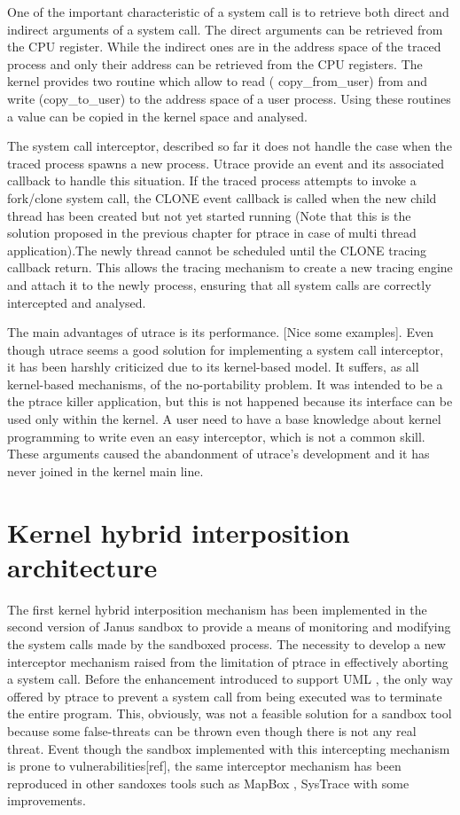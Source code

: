 One of the important characteristic of a system call is to retrieve both direct and indirect arguments of a system call. The direct arguments can be retrieved from the CPU register. While the indirect ones are in the address space of the traced process and only their address can be retrieved from the CPU registers. The kernel provides two routine which allow to read ( copy\_from\_user) from and write (copy\_to\_user) to the address space of a user process. Using these routines a value can be copied in the kernel space and analysed. 

The system call interceptor, described so far it does not handle the case when the traced process spawns a new process. Utrace provide an event and its associated callback to handle this situation. If the traced process attempts to invoke a fork/clone system call, the CLONE event callback is called when the new child thread has been created but not yet started running (Note that this is the solution proposed in the previous chapter for ptrace in case of multi thread application).The newly thread cannot be scheduled until the CLONE tracing callback return. 
This allows the tracing mechanism to create a new tracing engine and attach it to the newly process, ensuring that all system calls are correctly intercepted and analysed. 
 
The main advantages of utrace is its performance. [Nice some examples]. Even though utrace seems a good solution for implementing a system call interceptor, it has been harshly criticized due to its kernel-based model. It suffers, as all kernel-based mechanisms, of the no-portability problem. It was intended to be a the ptrace killer application, but this is not happened because its interface can be used only within the kernel. A user need to have a base knowledge about kernel programming to write even an easy interceptor, which is not a common skill. These arguments caused the abandonment of utrace's development and it has never joined in the kernel main line. 

\section{Kernel hybrid interposition architecture}
\label{interceptor_mechanism}

The first kernel hybrid interposition mechanism has been implemented in  the second version of Janus sandbox \cite{Janus} to provide a means of monitoring and modifying the system calls made by the sandboxed process. The necessity to develop a new interceptor mechanism raised from the limitation of ptrace in effectively aborting a system call. Before the enhancement introduced to support UML \citep{UML_1,UML_2}, the only way offered by ptrace to prevent a system call from being executed was to terminate the entire program. This, obviously, was not a feasible solution for a sandbox tool because some false-threats can be thrown even though there is not any real threat. 
Event though the sandbox implemented with this intercepting mechanism is prone to vulnerabilities[ref], the same interceptor mechanism has been reproduced in other sandoxes tools such as MapBox \cite{MapBox}, SysTrace \cite{systrace} with some improvements. 

